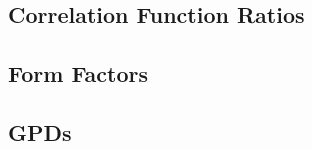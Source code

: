 \documentclass[11pt, oneside]{article}   	%
\theoremstyle{definition}
\begin{document}
\subsection{Correlation Function Ratios}

\subsection{Form Factors}

\subsection{GPDs}
\end{document}
